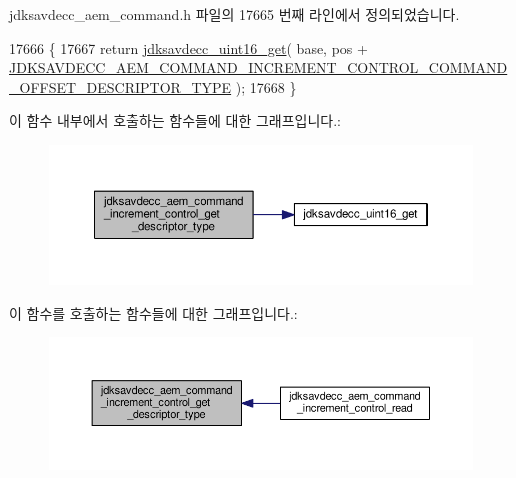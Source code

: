 jdksavdecc\+\_\+aem\+\_\+command.\+h 파일의 17665 번째 라인에서 정의되었습니다.


\begin{DoxyCode}
17666 \{
17667     \textcolor{keywordflow}{return} \hyperlink{group__endian_ga3fbbbc20be954aa61e039872965b0dc9}{jdksavdecc\_uint16\_get}( base, pos + 
      \hyperlink{group__command__increment__control_gab6f92328d54d984c88303e83f8ccf72b}{JDKSAVDECC\_AEM\_COMMAND\_INCREMENT\_CONTROL\_COMMAND\_OFFSET\_DESCRIPTOR\_TYPE}
       );
17668 \}
\end{DoxyCode}


이 함수 내부에서 호출하는 함수들에 대한 그래프입니다.\+:
\nopagebreak
\begin{figure}[H]
\begin{center}
\leavevmode
\includegraphics[width=350pt]{group__command__increment__control_ga4d1c2dffa148e378ddb53d256801b3cc_cgraph}
\end{center}
\end{figure}




이 함수를 호출하는 함수들에 대한 그래프입니다.\+:
\nopagebreak
\begin{figure}[H]
\begin{center}
\leavevmode
\includegraphics[width=350pt]{group__command__increment__control_ga4d1c2dffa148e378ddb53d256801b3cc_icgraph}
\end{center}
\end{figure}


